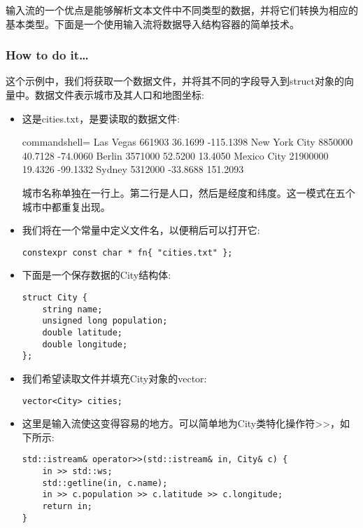 
输入流的一个优点是能够解析文本文件中不同类型的数据，并将它们转换为相应的基本类型。下面是一个使用输入流将数据导入结构容器的简单技术。

\subsubsection{How to do it…}

这个示例中，我们将获取一个数据文件，并将其不同的字段导入到struct对象的向量中。数据文件表示城市及其人口和地图坐标:

\begin{itemize}
\item 
这是cities.txt，是要读取的数据文件:

\begin{tcblisting}{commandshell={}}
Las Vegas
661903 36.1699 -115.1398
New York City
8850000 40.7128 -74.0060
Berlin
3571000 52.5200 13.4050
Mexico City
21900000 19.4326 -99.1332
Sydney
5312000 -33.8688 151.2093
\end{tcblisting}

城市名称单独在一行上。第二行是人口，然后是经度和纬度。这一模式在五个城市中都重复出现。

\item 
我们将在一个常量中定义文件名，以便稍后可以打开它:

\begin{lstlisting}[style=styleCXX]
constexpr const char * fn{ "cities.txt" };
\end{lstlisting}

\item 
下面是一个保存数据的City结构体:

\begin{lstlisting}[style=styleCXX]
struct City {
	string name;
	unsigned long population;
	double latitude;
	double longitude;
};
\end{lstlisting}

\item 
我们希望读取文件并填充City对象的vector:

\begin{lstlisting}[style=styleCXX]
vector<City> cities;
\end{lstlisting}

\item 
这里是输入流使这变得容易的地方。可以简单地为City类特化操作符>{}>，如下所示:

\begin{lstlisting}[style=styleCXX]
std::istream& operator>>(std::istream& in, City& c) {
	in >> std::ws;
	std::getline(in, c.name);
	in >> c.population >> c.latitude >> c.longitude;
	return in;
}
\end{lstlisting}


\end{itemize}
